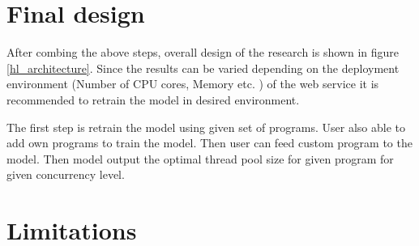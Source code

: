 \section{Final design}

After combing the above steps, overall design of the research is shown in figure \ref{hl_architecture}. Since the results can be varied depending on the deployment environment (Number of CPU cores, Memory etc. ) of the web service it is recommended to retrain the model in desired environment.

The first step is retrain the model using given set of programs. User also able to add own programs to train the model. Then user can feed custom program to the model. Then model output the optimal thread pool size for given program for given concurrency level.

\section{Limitations}

